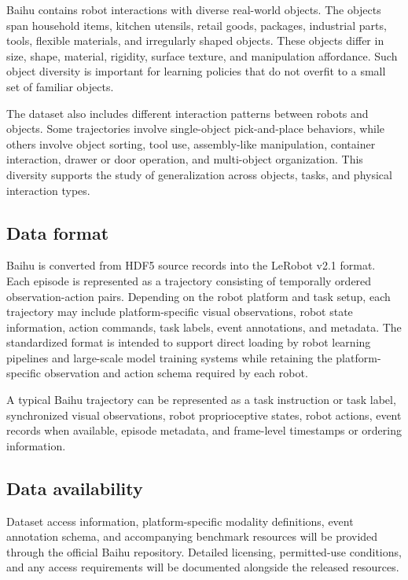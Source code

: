 Baihu contains robot interactions with diverse real-world objects. The objects span household items, kitchen utensils, retail goods, packages, industrial parts, tools, flexible materials, and irregularly shaped objects. These objects differ in size, shape, material, rigidity, surface texture, and manipulation affordance. Such object diversity is important for learning policies that do not overfit to a small set of familiar objects.

The dataset also includes different interaction patterns between robots and objects. Some trajectories involve single-object pick-and-place behaviors, while others involve object sorting, tool use, assembly-like manipulation, container interaction, drawer or door operation, and multi-object organization. This diversity supports the study of generalization across objects, tasks, and physical interaction types.

\subsection{Data format}

Baihu is converted from HDF5 source records into the LeRobot v2.1 format. Each episode is represented as a trajectory consisting of temporally ordered observation-action pairs. Depending on the robot platform and task setup, each trajectory may include platform-specific visual observations, robot state information, action commands, task labels, event annotations, and metadata. The standardized format is intended to support direct loading by robot learning pipelines and large-scale model training systems while retaining the platform-specific observation and action schema required by each robot.

A typical Baihu trajectory can be represented as a task instruction or task label, synchronized visual observations, robot proprioceptive states, robot actions, event records when available, episode metadata, and frame-level timestamps or ordering information.

\subsection{Data availability}

Dataset access information, platform-specific modality definitions, event annotation schema, and accompanying benchmark resources will be provided through the official Baihu repository. Detailed licensing, permitted-use conditions, and any access requirements will be documented alongside the released resources.
